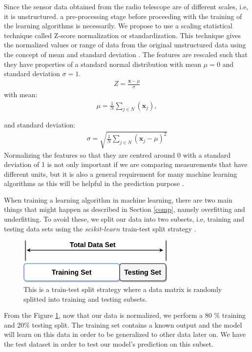 Since the sensor data obtained from the radio telescope are of different scales, i.e, it is unstructured. a pre-processing stage before proceeding with the training of the learning algorithms is necessarily. We propose to use a scaling statistical technique called Z-score normalization or standardization. This technique gives the normalized values or range of data from the original unstructured data using the concept of mean and standard deviation \citep{patro2015normalization}. The features are rescaled such that they have properties of a standard normal distribution with mean $\mu=0$ and standard deviation $\sigma=1$. 
\begin{align}
Z=\frac{\textbf{x}- \mu}{\sigma}
\end{align}
with mean:
\begin{align*}
\mu= \frac{1}{N} \sum_{j\in N} (\textbf{x}_j),
\end{align*}

and standard deviation:
\begin{align*}
\sigma=\sqrt{ \frac{1}{N} \sum_{j\in N} (\textbf{x}_j-\mu )^2}
\end{align*}
Normalizing the features so that they are centred around 0 with a standard deviation of 1 is not only important if we are comparing measurements that have different units, but it is also a general requirement for many machine learning algorithms as this will be helpful in the prediction purpose \citep{bott2014feature}.

When training a learning algorithm  in machine learning, there are two main things that might happen as described in Section \ref{comp}, namely overfitting and underfitting. To avoid these, we split our data into two subsets, i.e, training and testing data sets using the $\textit{scikit-learn}$ train-test split strategy \citep{buitinck2013api}. 

  \begin{figure}[H]
  \centering
    \includegraphics[width=0.7\textwidth]{images/t_s.png}
    \caption{This is a train-test split strategy where a data matrix is randomly splitted into training and testing  subsets.}
  \label{ts}
\end{figure}

From the Figure \ref{ts}, now that our data is normalized, we perform a 80 $\%$ training and 20$\%$ testing split. The training set contains a known output and the model will learn on this data in order to be generalized to other data later on. We have the test dataset in order to test our model's prediction on this subset.
 
